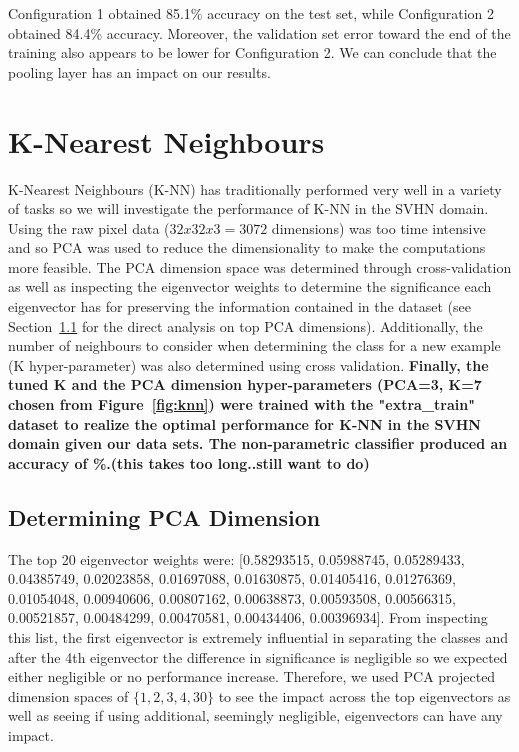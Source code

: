 \documentclass{article} %
\begin{document}
Configuration 1 obtained 85.1\% accuracy on the test set, while Configuration 2 obtained 84.4\% accuracy. Moreover, the validation set error toward the end of the training also appears to be lower for Configuration 2. We can conclude that the pooling layer has an impact on our results. 

\subsubsection{}

\section{K-Nearest Neighbours}
K-Nearest Neighbours (K-NN) has traditionally performed very well in a variety of tasks so we will investigate the performance of K-NN in the SVHN domain. Using the raw pixel data ($32 x 32 x 3 = 3072$ dimensions) was too time intensive and so PCA was used to reduce the dimensionality to make the computations more feasible.  The PCA dimension space was determined through cross-validation as well as inspecting the eigenvector weights to determine the significance each eigenvector has for preserving the information contained in the dataset (see Section~\ref{knn_pca} for the direct analysis on top PCA dimensions).  Additionally, the number of neighbours to consider when determining the class for a new example (K hyper-parameter) was also determined using cross validation. \textbf{Finally, the tuned K and the PCA dimension hyper-parameters (PCA=3, K=7 chosen from Figure~\ref{fig:knn}) were trained with the "extra\_train" dataset to realize the optimal performance for K-NN in the SVHN domain given our data sets. The non-parametric classifier produced an accuracy of \%.(this takes too long..still want to do)}

\subsection{Determining PCA Dimension} \label{knn_pca}
The top 20 eigenvector weights were: [0.58293515, 0.05988745, 0.05289433, 0.04385749, 0.02023858, 0.01697088, 0.01630875, 0.01405416, 0.01276369, 0.01054048, 0.00940606, 0.00807162, 0.00638873, 0.00593508, 0.00566315, 0.00521857, 0.00484299, 0.00470581, 0.00434406, 0.00396934].  From inspecting this list, the first eigenvector is extremely influential in separating the classes and after the 4th eigenvector the difference in significance is negligible so we expected either negligible or no performance increase.  Therefore, we used PCA projected dimension spaces of $\{1, 2, 3, 4, 30\}$ to see the impact across the top eigenvectors as well as seeing if using additional, seemingly negligible, eigenvectors can have any impact.
\end{document}
